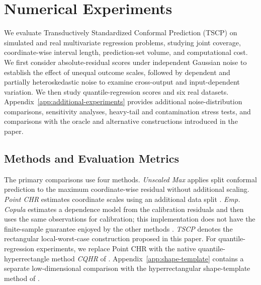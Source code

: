 
\begingroup
\color{blue}
\setlength{\emergencystretch}{2em}

\FloatBarrier
\section{Numerical Experiments}
\label{sec:numerical-experiments}
\label{sec:experiments}

We evaluate Transductively Standardized Conformal Prediction (TSCP) on
simulated and real multivariate regression problems, studying joint coverage,
coordinate-wise interval length, prediction-set volume, and computational cost. 
We first consider absolute-residual scores under independent Gaussian noise
to establish the effect of unequal outcome scales, followed by dependent
and partially heteroskedastic noise to examine cross-output and
input-dependent variation. We then study quantile-regression scores and
six real datasets. Appendix~\ref{app:additional-experiments} provides
additional noise-distribution comparisons, sensitivity analyses, heavy-tail
and contamination stress tests, and comparisons with the oracle and
alternative constructions introduced in the paper.

\subsection{Methods and Evaluation Metrics}
\label{sec:experiment-methods}

The primary comparisons use four methods. \emph{Unscaled Max} applies split
conformal prediction to the maximum coordinate-wise residual without
additional scaling. \emph{Point CHR} estimates coordinate scales using an
additional data split \citep{sampson2024conformal}. \emph{Emp.
Copula} estimates a dependence model from the calibration residuals and then
uses the same observations for calibration; this implementation does not have
the finite-sample guarantee enjoyed by the other methods
\citep{messoudi2021copula}. \emph{TSCP} denotes
the rectangular local-worst-case construction proposed in this paper. For
quantile-regression experiments, we replace Point CHR with the native
quantile-hyperrectangle method \emph{CQHR} of
\citet{sampson2024conformal}. Appendix~\ref{app:shape-template} contains a
separate low-dimensional comparison with the hyperrectangular shape-template
method of \citet{tumu2024templates}.

